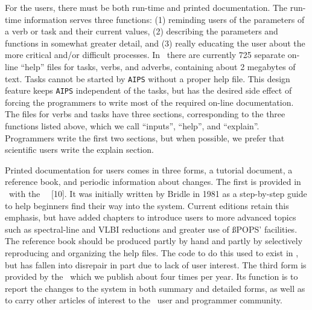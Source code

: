      For the users, there must be both run-time and printed documentation.
The run-time information serves three functions: (1) reminding users of the
parameters of a verb or task and their current values, (2) describing the
parameters and functions in somewhat greater detail, and (3) really
educating the user about the more critical and/or difficult processes.
In \AIPS\ there are currently 725 separate on-line ``help'' files for
tasks, verbs, and adverbs, containing about 2 megabytes of text.  Tasks
cannot be started by {\tt AIPS} without a proper help file.  This design
feature keeps {\tt AIPS} independent of the tasks, but has the desired
side effect of forcing the programmers to write most of the required
on-line documentation.  The files for verbs and tasks have three sections,
corresponding to the three functions listed above, which we call
``inputs'', ``help'', and ``explain''.  Programmers write the first two
sections, but when possible, we prefer that scientific users write
the explain section.

     Printed documentation for users comes in three forms, a tutorial
document, a reference book, and periodic information about changes.
The first is provided in \AIPS\ with the \AIPS\ \Cookbook\ [10].
It was initially written by Bridle in 1981 as a step-by-step guide to
help beginners find their way into the system.  Current editions retain
this emphasis, but have added chapters to introduce users to more
advanced topics such as spectral-line and VLBI reductions and greater
use of {\ss POPS}' facilities.  The reference book should be produced
partly by hand and partly by selectively reproducing and organizing
the help files.  The code to do this used to exist in \AIPS, but has
fallen into disrepair in part due to lack of user interest.  The third
form is provided by the \Aipsletter\ which we publish about four times
per year.  Its function is to report the changes to the system in both
summary and detailed forms, as well as to carry other articles of
interest to the \AIPS\ user and programmer community.

